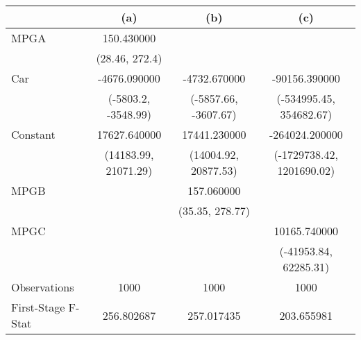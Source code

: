 \begin{tabular}{lccc}
\toprule
 & (a) & (b) & (c) \\
\midrule
MPGA & 150.430000 &   &   \\
  & (28.46, 272.4) &   &   \\
Car & -4676.090000 & -4732.670000 & -90156.390000 \\
  & (-5803.2, -3548.99) & (-5857.66, -3607.67) & (-534995.45, 354682.67) \\
Constant & 17627.640000 & 17441.230000 & -264024.200000 \\
  & (14183.99, 21071.29) & (14004.92, 20877.53) & (-1729738.42, 1201690.02) \\
MPGB &   & 157.060000 &   \\
 &   & (35.35, 278.77) &   \\
MPGC &   &   & 10165.740000 \\
 &   &   & (-41953.84, 62285.31) \\
Observations & 1000 & 1000 & 1000 \\
First-Stage F-Stat & 256.802687 & 257.017435 & 203.655981 \\
\bottomrule
\end{tabular}
